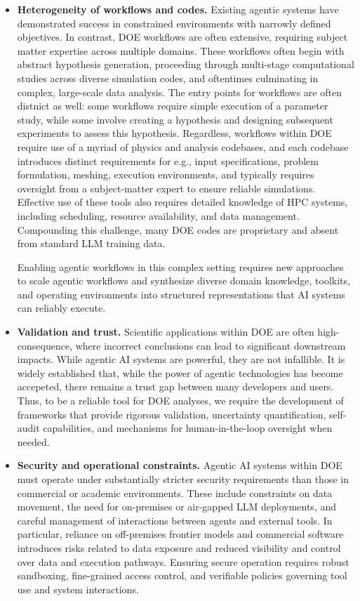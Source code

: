 \documentclass[11pt]{article} \usepackage[margin=1in]{geometry}
\begin{document}
\begin{itemize} \item \textbf{Heterogeneity of workflows and codes.} Existing
agentic systems have demonstrated success in constrained environments with
narrowly defined objectives. In contrast, DOE workflows are often extensive,
requiring subject matter expertise across multiple domains. These workflows often begin with abstract hypothesis generation, proceeding
through multi-stage computational studies across diverse simulation codes, and
oftentimes culminating in complex, large-scale data analysis. The entry points
for workflows are often distnict as well: some workflows require simple
execution of a parameter study, while some involve creating a hypothesis and
designing subsequent experiments to assess this hypothesis. Regardless,
workflows within DOE require use of a myriad of physics and analysis codebases, and each codebase
introduces distinct requirements for e.g., input specifications, problem
formulation, meshing, execution environments, and typically requires oversight from a
subject-matter expert to ensure reliable simulations. Effective use of these
tools also requires detailed knowledge of HPC systems, including scheduling,
resource availability, and data management. Compounding this challenge, many DOE
codes are proprietary and absent from standard LLM training data. 

Enabling agentic workflows in this complex setting requires new approaches to
scale agentic workflows and synthesize diverse domain knowledge, toolkits, and operating
environments into structured representations that AI systems can reliably
execute.

\item \textbf{Validation and trust.} Scientific applications within DOE are
often high-consequence, where incorrect conclusions can lead to significant
downstream impacts. While agentic AI systems are powerful, they are not
infallible. It is widely established that, while the power of agentic
technologies has become accepeted, there remains a trust gap between many
developers and users. Thus, to be a reliable tool for DOE analyses, we require
the development of frameworks that provide rigorous validation, uncertainty quantification, self-audit capabilities, and
mechanisms for human-in-the-loop oversight when needed.

    \item \textbf{Security and operational constraints.} Agentic AI systems
within DOE must operate under substantially stricter security requirements than
those in commercial or academic environments. These include constraints on data
movement, the need for on-premises or air-gapped LLM deployments, and careful
management of interactions between agents and external tools. In particular,
reliance on off-premises frontier models and commercial software introduces
risks related to data exposure and reduced visibility and control over data and
execution pathways. Ensuring secure operation requires robust sandboxing,
fine-grained access control, and verifiable policies governing tool use and
system interactions.  \end{itemize}
\end{document}
